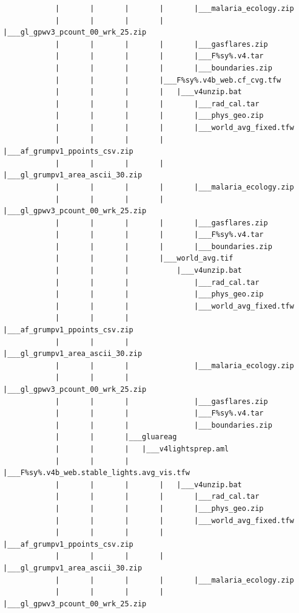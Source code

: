 \documentclass[]{book}
\begin{document}
\begin{verbatim}
            |       |       |       |       |___malaria_ecology.zip
            |       |       |       |       |___gl_gpwv3_pcount_00_wrk_25.zip
            |       |       |       |       |___gasflares.zip
            |       |       |       |       |___F%sy%.v4.tar
            |       |       |       |       |___boundaries.zip
            |       |       |       |___F%sy%.v4b_web.cf_cvg.tfw
            |       |       |       |   |___v4unzip.bat
            |       |       |       |       |___rad_cal.tar
            |       |       |       |       |___phys_geo.zip
            |       |       |       |       |___world_avg_fixed.tfw
            |       |       |       |       |___af_grumpv1_ppoints_csv.zip
            |       |       |       |       |___gl_grumpv1_area_ascii_30.zip
            |       |       |       |       |___malaria_ecology.zip
            |       |       |       |       |___gl_gpwv3_pcount_00_wrk_25.zip
            |       |       |       |       |___gasflares.zip
            |       |       |       |       |___F%sy%.v4.tar
            |       |       |       |       |___boundaries.zip
            |       |       |       |___world_avg.tif
            |       |       |           |___v4unzip.bat
            |       |       |               |___rad_cal.tar
            |       |       |               |___phys_geo.zip
            |       |       |               |___world_avg_fixed.tfw
            |       |       |               |___af_grumpv1_ppoints_csv.zip
            |       |       |               |___gl_grumpv1_area_ascii_30.zip
            |       |       |               |___malaria_ecology.zip
            |       |       |               |___gl_gpwv3_pcount_00_wrk_25.zip
            |       |       |               |___gasflares.zip
            |       |       |               |___F%sy%.v4.tar
            |       |       |               |___boundaries.zip
            |       |       |___gluareag
            |       |       |   |___v4lightsprep.aml
            |       |       |       |___F%sy%.v4b_web.stable_lights.avg_vis.tfw
            |       |       |       |   |___v4unzip.bat
            |       |       |       |       |___rad_cal.tar
            |       |       |       |       |___phys_geo.zip
            |       |       |       |       |___world_avg_fixed.tfw
            |       |       |       |       |___af_grumpv1_ppoints_csv.zip
            |       |       |       |       |___gl_grumpv1_area_ascii_30.zip
            |       |       |       |       |___malaria_ecology.zip
            |       |       |       |       |___gl_gpwv3_pcount_00_wrk_25.zip

\end{verbatim}
\end{document}
